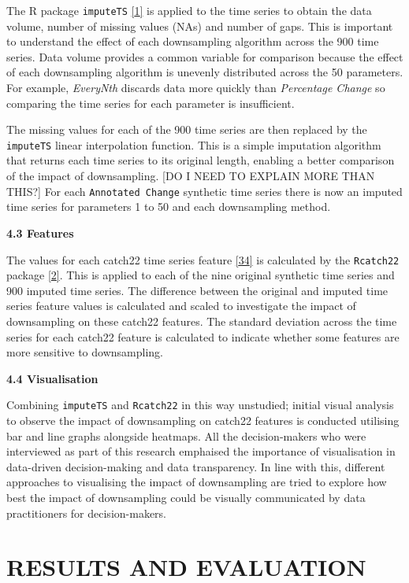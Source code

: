 \documentclass{article}
\begin{document}
The R package \texttt{imputeTS}
\protect\hyperlink{ref-imputeTS_R}{{[}1{]}} is applied to the time
series to obtain the data volume, number of missing values (NAs) and
number of gaps. This is important to understand the effect of each
downsampling algorithm across the 900 time series. Data volume provides
a common variable for comparison because the effect of each downsampling
algorithm is unevenly distributed across the 50 parameters. For example,
\emph{EveryNth} discards data more quickly than \emph{Percentage Change}
so comparing the time series for each parameter is insufficient.

The missing values for each of the 900 time series are then replaced by
the \texttt{imputeTS} linear interpolation function. This is a simple
imputation algorithm that returns each time series to its original
length, enabling a better comparison of the impact of downsampling.
{[}DO I NEED TO EXPLAIN MORE THAN THIS?{]} For each
\texttt{Annotated\ Change} synthetic time series there is now an imputed
time series for parameters 1 to 50 and each downsampling method.

\textbf{4.3 Features}

The values for each catch22 time series feature
\protect\hyperlink{ref-catch22}{{[}34{]}} is calculated by the
\texttt{Rcatch22} package \protect\hyperlink{ref-catch22_R}{{[}2{]}}.
This is applied to each of the nine original synthetic time series and
900 imputed time series. The difference between the original and imputed
time series feature values is calculated and scaled to investigate the
impact of downsampling on these catch22 features. The standard deviation
across the time series for each catch22 feature is calculated to
indicate whether some features are more sensitive to downsampling.

\textbf{4.4 Visualisation}

Combining \texttt{imputeTS} and \texttt{Rcatch22} in this way unstudied;
initial visual analysis to observe the impact of downsampling on catch22
features is conducted utilising bar and line graphs alongside heatmaps.
All the decision-makers who were interviewed as part of this research
emphaised the importance of visualisation in data-driven decision-making
and data transparency. In line with this, different approaches to
visualising the impact of downsampling are tried to explore how best the
impact of downsampling could be visually communicated by data
practitioners for decision-makers.

\hypertarget{results-and-evaluation}{%
\section{RESULTS AND EVALUATION}\label{results-and-evaluation}}
\end{document}
